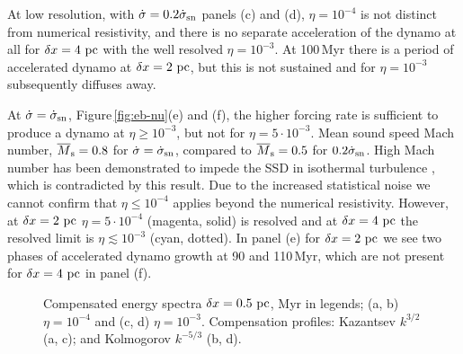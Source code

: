 \documentclass[preprint2]{aastex63}
\newcommand\SNr{\dot\sigma_{\rm sn}}
\newcommand\Ms{M_{\rm s}}
\newcommand\pc{~ {\rm pc}}
\newcommand\dx{ {\delta x}}
\begin{document}
At low resolution, with $\dot\sigma=0.2\SNr$ panels (c) and (d), $\eta=10^{-4}$
is not distinct from numerical resistivity, and there is no separate
acceleration of the dynamo at all for $\dx=4\pc$ with the well resolved
$\eta=10^{-3}$.
At 100\,Myr there is a period of accelerated dynamo at $\dx=2\pc$, but this is
not sustained and for $\eta=10^{-3}$ subsequently diffuses away.

At $\dot\sigma=\SNr$, Figure\,\ref{fig:eb-nu}(e) and (f), the 
higher forcing rate is sufficient to produce a dynamo at $\eta\geq10^{-3}$, but
not for $\eta=5\cdot10^{-3}$.
Mean sound speed Mach number, $\overline\Ms=0.8$ for $\dot\sigma=\SNr$,
compared to $\overline\Ms=0.5$ for $0.2\SNr$.
High Mach number has been demonstrated to impede the SSD in isothermal 
turbulence \citep{Haugen:2004M}, which is contradicted by this result.
%
Due to the increased statistical noise we cannot confirm that $\eta\leq10^{-4}$
applies beyond the numerical resistivity.
However, at $\dx=2\pc$ $\eta=5\cdot10^{-4}$ (magenta, solid) is resolved and
at $\dx=4\pc$ the resolved limit is $\eta\lesssim10^{-3}$ (cyan, dotted).
In panel (e) for $\dx=2\pc$ we see two phases of accelerated dynamo growth at
90 and 110\,Myr, which are not present for $\dx=4\pc$ in panel (f).

\begin{figure*}
\caption{
Compensated energy spectra $\dx=0.5\pc$, Myr in legends;
(a, b) $\eta=10^{-4}$ and  (c, d) $\eta=10^{-3}$.
Compensation profiles: Kazantsev
$k^{3/2}$ (a, c); and Kolmogorov $k^{-5/3}$ (b, d).
\label{fig:4power}}
\end{figure*}
\end{document}

